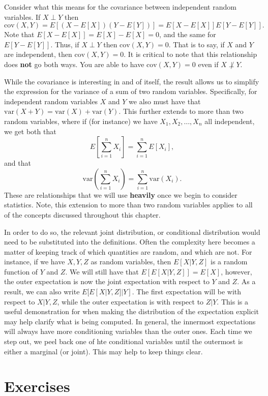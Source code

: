 \documentclass[
  letterpaper,
  DIV=11,
  numbers=noendperiod]{scrreprt}
\theoremstyle{definition}
\theoremstyle{definition}
\theoremstyle{definition}
\theoremstyle{remark}
\begin{document}
Consider what this means for the covariance between independent random
variables. If \(X\perp Y\) then
\[\text{cov}(X,Y) = E[(X-E[X])(Y-E[Y])] = E[X-E[X]]E[Y-E[Y]].\] Note
that \(E[X - E[X]] = E[X] - E[X] = 0\), and the same for
\(E[Y - E[Y]]\). Thus, if \(X \perp Y\) then \(\text{cov}(X, Y) = 0\).
That is to say, if \(X\) and \(Y\) are independent, then
\(\text{cov}(X,Y)=0\). It is critical to note that this relationship
does \textbf{not} go both ways. You are able to have
\(\text{cov}(X,Y) = 0\) even if \(X\not\perp Y\).

While the covariance is interesting in and of itself, the result allows
us to simplify the expression for the variance of a sum of two random
variables. Specifically, for independent random variables \(X\) and
\(Y\) we also must have that
\(\text{var}(X+Y)=\text{var}(X)+\text{var}(Y)\). This further extends to
more than two random variables, where if (for instance) we have
\(X_1,X_2,\dots,X_n\) all independent, we get both that
\[E\left[\sum_{i=1}^n X_i\right] = \sum_{i=1}^n E[X_i],\] and that
\[\text{var}\left(\sum_{i=1}^n X_i\right) = \sum_{i=1}^n \text{var}(X_i).\]
These are relationships that we will use \textbf{heavily} once we begin
to consider statistics. Note, this extension to more than two random
variables applies to all of the concepts discussed throughout this
chapter.

In order to do so, the relevant joint distribution, or conditional
distribution would need to be substituted into the definitions. Often
the complexity here becomes a matter of keeping track of which
quantities are random, and which are not. For instance, if we have
\(X,Y,Z\) as random variables, then \(E[X|Y,Z]\) is a random function of
\(Y\) and \(Z\). We will still have that \(E[E[X|Y,Z]] = E[X]\),
however, the outer expectation is now the joint expectation with respect
to \(Y\) and \(Z\). As a result, we can also write \(E[E[X|Y,Z]|Y]\).
The first expectation will be with respect to \(X|Y,Z\), while the outer
expectation is with respect to \(Z|Y\). This is a useful demonstration
for when making the distribution of the expectation explicit may help
clarify what is being computed. In general, the innermost expectations
will always have more conditioning variables than the outer ones. Each
time we step out, we peel back one of hte conditional variables until
the outermost is either a marginal (or joint). This may help to keep
things clear.

\section*{Exercises}\label{exercises-5}
\end{document}
